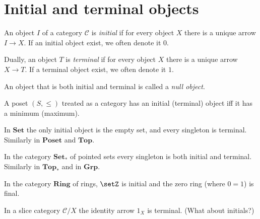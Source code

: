 \documentclass[article, a4paper, 11pt, oneside]{memoir}
\numberwithin{equation}{chapter}
\newcommand{\cat}[1]{\mathcal{#1}}
\newcommand{\ncat}[1]{\mathbf{#1}} %
\newcommand{\catSet}{\ncat{Set}}
\newcommand{\catTop}{\ncat{Top}}
\newcommand{\catGrp}{\ncat{Grp}}
\newcommand{\catRing}{\ncat{Ring}}
\newcommand{\catPoset}{\ncat{Poset}}
\newcommand{\catC}{\cat{C}}
\begin{document}
        





\chapter{Initial and terminal objects}

\newcommand{\arr}[1]{\vec{#1}}

\begin{definition}
    An object $I$ of a category $\catC$ is \emph{initial} if for every object $X$ there is a unique arrow $I \to X$. If an initial object exist, we often denote it $0$.

    Dually, an object $T$ is \emph{terminal} if for every object $X$ there is a unique arrow $X \to T$. If a terminal object exist, we often denote it $1$.

    An object that is both initial and terminal is called a \emph{null object}.
\end{definition}


\begin{examplebreak}
    \begin{enumexample}
        \item A poset $(S, \leq)$ treated as a category has an initial (terminal) object iff it has a minimum (maximum).
        
        \item In $\catSet$ the only initial object is the empty set, and every singleton is terminal. Similarly in $\catPoset$ and $\catTop$.
        
        \item In the category $\catSet_*$ of pointed sets every singleton is both initial and terminal. Similarly in $\catTop_*$ and in $\catGrp$.
        
        \item In the category $\catRing$ of rings, $\setZ$ is initial and the zero ring (where $0 = 1$) is final.
        
        \item In a slice category $\catC/X$ the identity arrow $1_X$ is terminal. (What about initials?)
    \end{enumexample}
\end{examplebreak}
\end{document}
